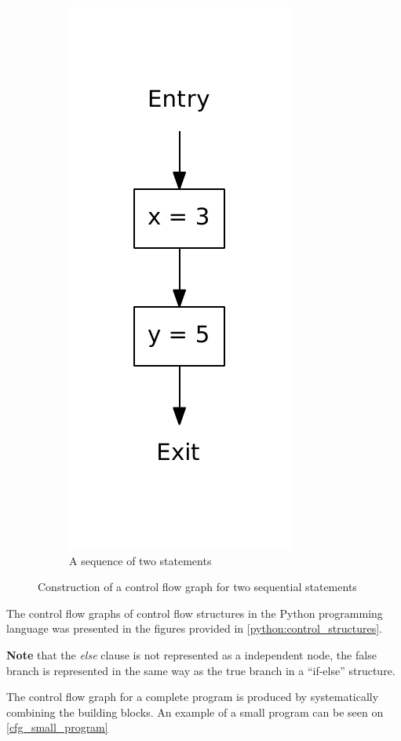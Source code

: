 \begin{figure}
\begin{subfigure}[b]{0.49\textwidth}
    \includegraphics[scale=0.5]{figures/sequence.pdf}
    \caption{A sequence of two statements}
  \end{subfigure}
  \caption{Construction of a control flow graph for two sequential statements}
  \label{cfg_sequence}
\end{figure}

The control flow graphs of  control flow structures in the Python programming language was presented in the figures provided in \cref{python:control_structures}.

\textbf{Note} that the \textit{else} clause is not represented as a independent node, the false branch is represented in the same way as the true branch in a ``if-else'' structure.

The control flow graph for a complete program is produced by systematically combining the building blocks.
An example of a small program can be seen on \cref{cfg_small_program}

